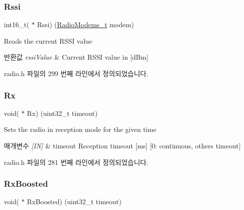 \subsubsection{\texorpdfstring{Rssi}{Rssi}}
{\footnotesize\ttfamily int16\+\_\+t( $\ast$ Rssi) (\mbox{\hyperlink{radio_8h_a992ef7a5b7f52975ba7bd8dd97740057}{Radio\+Modems\+\_\+t}} modem)}



Reads the current R\+S\+SI value 


\begin{DoxyRetVals}{반환값}
{\em rssi\+Value} & Current R\+S\+SI value in \mbox{[}d\+Bm\mbox{]} \\
\hline
\end{DoxyRetVals}


radio.\+h 파일의 299 번째 라인에서 정의되었습니다.

\mbox{\label{struct_radio__s_a28354465b3df8db25bd766e54c96d837}} 
\subsubsection{\texorpdfstring{Rx}{Rx}}
{\footnotesize\ttfamily void( $\ast$ Rx) (uint32\+\_\+t timeout)}



Sets the radio in reception mode for the given time 


\begin{DoxyParams}{매개변수}
{\em \mbox{[}\+I\+N\mbox{]}} & timeout Reception timeout \mbox{[}ms\mbox{]} \mbox{[}0\+: continuous, others timeout\mbox{]} \\
\hline
\end{DoxyParams}


radio.\+h 파일의 281 번째 라인에서 정의되었습니다.

\mbox{\label{struct_radio__s_abb6a28b218d2e018c09f79449a5f4fd9}} 
\subsubsection{\texorpdfstring{Rx\+Boosted}{RxBoosted}}
{\footnotesize\ttfamily void( $\ast$ Rx\+Boosted) (uint32\+\_\+t timeout)}



